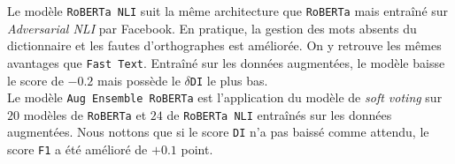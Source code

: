 Le modèle \texttt{RoBERTa NLI} suit la même architecture que \texttt{RoBERTa} mais entraîné sur \textit{Adversarial NLI} par Facebook. En pratique, la gestion des mots absents du dictionnaire et les fautes d'orthographes est améliorée. On y retrouve les mêmes avantages que \texttt{Fast Text}. Entraîné sur les données augmentées, le modèle baisse le score de $-0.2$ mais possède le $\delta$\texttt{DI} le plus bas.\\
Le modèle \texttt{Aug Ensemble RoBERTa} est l'application du modèle de \textit{soft voting} sur $20$ modèles de \texttt{RoBERTa} et $24$ de \texttt{RoBERTa NLI} entraînés sur les données augmentées. Nous nottons que si le score \texttt{DI} n'a pas baissé comme attendu, le score \texttt{F1} a été amélioré de $+0.1$ point.
\hfill\\

\hfill\\

\hfill\\

